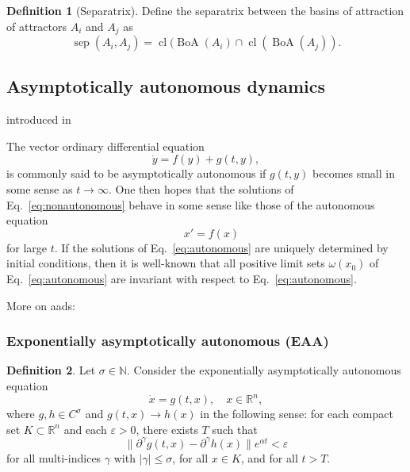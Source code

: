 \documentclass{article}
\theoremstyle{definition} \newtheorem{definition}{Definition}
\theoremstyle{remark} \newtheorem{remark}{Remark}
\newcommand{\sep}{\operatorname{sep}}
\newcommand{\cl}{\operatorname{cl}}
\newcommand{\boa}{\operatorname{BoA}}
\newcounter{ct}
\begin{document}
\begin{definition}[Separatrix]\label{def:separatrix}
Define the separatrix between the basins of attraction of attractors $A_i$ and $A_j$ as 
\begin{equation}
\sep(A_i,A_j) = \cl(\boa(A_i)\cap \cl(\boa(A_j)).
\end{equation}
\end{definition}











\subsection{Asymptotically autonomous dynamics}\label{sec:asyauto}
introduced in \citep{markus1956asyauto}

The vector ordinary differential equation  
\begin{equation}\label{eq:nonautonomous}
 \dot y = f(y) + g(t, y),
\end{equation}
is commonly said to be asymptotically autonomous if \( g(t, y) \) becomes small in some sense as \( t \to \infty \). One then hopes that the solutions of Eq.~\ref{eq:nonautonomous} behave in some sense like those of the autonomous equation  
\begin{equation}\label{eq:autonomous}
\quad x' = f(x)
\end{equation}
for large \( t \). If the solutions of Eq.~\ref{eq:autonomous} are uniquely determined by initial conditions,   then it is well-known \cite{} that all positive limit sets \( \omega(x_0) \) of Eq.~\ref{eq:autonomous} are invariant with respect to Eq.~\ref{eq:autonomous}.

More on aads: \citep{wieczorek2021compactification}

\subsubsection{Exponentially asymptotically autonomous (EAA)}
\begin{definition}\label{def:eaa}
Let \(\sigma \in \mathbb{N}\). Consider the exponentially asymptotically autonomous equation  
\[
\dot{x} = g(t,x), \quad x \in \mathbb{R}^n,
\]
where \( g, h \in C^\sigma \) and \( g(t,x) \to h(x) \) in the following sense: for each compact set \( K \subset \mathbb{R}^n \) and each \( \varepsilon > 0 \), there exists \( T \) such that  
\[
\|\partial^\gamma g(t,x) - \partial^\gamma h(x)\| e^{\alpha t} < \varepsilon
\]
for all multi-indices \( \gamma \) with \( |\gamma| \leq \sigma \), for all \( x \in K \), and for all \( t > T \).
\end{definition}
\end{document}
